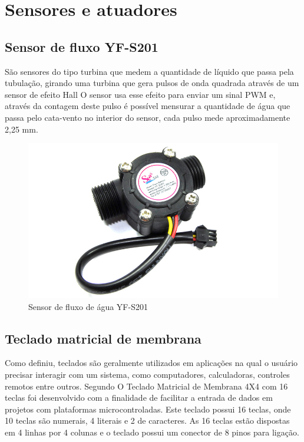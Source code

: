 \section{Sensores e atuadores}

\subsection{Sensor de fluxo YF-S201}

São sensores do tipo turbina que medem a quantidade de líquido que passa pela tubulação, girando uma turbina que
gera pulsos de onda quadrada através de um sensor de efeito Hall \cite{roque2018sistema} O
sensor usa esse efeito para enviar um sinal PWM e, através da contagem deste pulso é possível mensurar a quantidade de água que passa pelo cata-vento no interior do sensor, cada pulso mede aproximadamente 2,25 mm.\cite{ms2017automaccao}

\begin{figure}[htbp]
		\centering
		\includegraphics[scale=0.3]{figuras/yf-s201.jpg}
		\caption{Sensor de fluxo de água YF-S201}
		\label{fig:03}
\end{figure}

\subsection{Teclado matricial de membrana}

Como \cite {teclado-matricial-1} definiu, teclados são geralmente utilizados em aplicações na qual o usuário precisar interagir com um sistema, como computadores, calculadoras, controles remotos entre outros. Segundo \cite{teclado-matricial} O Teclado Matricial de Membrana 4X4 com 16 teclas foi desenvolvido com a finalidade de facilitar a entrada de dados em projetos com plataformas microcontroladas. Este teclado possui 16 teclas, onde 10 teclas são numerais, 4 literais e 2 de caracteres. As 16 teclas estão dispostas em 4 linhas por 4 colunas e o teclado possui um conector de 8 pinos para ligação.

